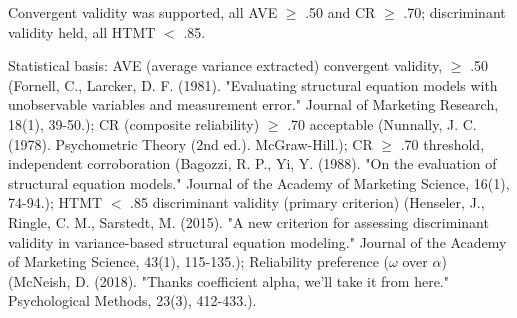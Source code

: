 \documentclass{article}
\begin{document}
Convergent validity was supported, all AVE $\ge$ .50 and CR $\ge$ .70; discriminant validity held, all HTMT $<$ .85.

Statistical basis: AVE (average variance extracted) convergent validity, $\ge$ .50 (Fornell, C., Larcker, D. F. (1981). "Evaluating structural equation models with unobservable variables and measurement error." Journal of Marketing Research, 18(1), 39-50.); CR (composite reliability) $\ge$ .70 acceptable (Nunnally, J. C. (1978). Psychometric Theory (2nd ed.). McGraw-Hill.); CR $\ge$ .70 threshold, independent corroboration (Bagozzi, R. P., Yi, Y. (1988). "On the evaluation of structural equation models." Journal of the Academy of Marketing Science, 16(1), 74-94.); HTMT $<$ .85 discriminant validity (primary criterion) (Henseler, J., Ringle, C. M., Sarstedt, M. (2015). "A new criterion for assessing discriminant validity in variance-based structural equation modeling." Journal of the Academy of Marketing Science, 43(1), 115-135.); Reliability preference ($\omega$ over $\alpha$) (McNeish, D. (2018). "Thanks coefficient alpha, we'll take it from here." Psychological Methods, 23(3), 412-433.).
\end{document}
